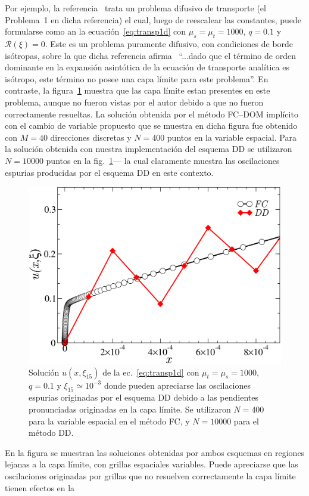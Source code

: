 Por ejemplo, la referencia~\cite{Larsen1987} trata un problema 
difusivo de transporte (el Problema~1 en dicha referencia) 
el cual, luego de reescalear las constantes, puede formularse 
como an la ecuación~\eqref{eq:transp1d} con $\mu_s=\mu_t=1000$,
 $q=0.1$ y $\mathcal{R}(\xi)=0$. Este es un problema 
 puramente difusivo, con condiciones de borde isótropas, 
 sobre la que dicha referencia afirma~\cite[pp. 317]{Larsen1987} 
 ``...dado que el término de orden dominante en la expansión asintótica 
 de la ecuación de transporte analítica es isótropo, 
 este término no posee una capa límite para este problema''. 
 En contraste, la figura~\ref{fig:DDlayer} muestra que 
 las capa límite estan presentes en este problema, aunque 
 no fueron vistas por el autor debido a que no fueron correctamente 
 resueltas. La solución obtenida por el método FC--DOM implícito 
 con el cambio de variable propuesto que se muestra en dicha figura 
 fue obtenido con $M=40$ direcciones discretas y $N=400$ puntos 
 en la variable espacial. Para la solución obtenida con nuestra implementación 
 del esquema DD se utilizaron $N=10000$ puntos en la fig.~\ref{fig:DDlayer}---
 la cual claramente muestra las oscilaciones espurias producidas 
 por el esquema DD en este contexto.
\begin{figure}[h!]
\centering
  \includegraphics[width=0.5\linewidth]{figuras/layerlar.pdf}
  \caption{Solución $u(x,\xi_{15})$ de la ec.~\eqref{eq:transp1d} 
  con $\mu_t=\mu_s=1000$, $q=0.1$ y $\xi_{\text{15}} \simeq 10^{-3}$
  donde pueden apreciarse las oscilaciones espurias originadas 
  por el esquema DD debido a las pendientes pronunciadas originadas 
  en la capa límite. Se utilizaron $N=400$ para la variable espacial 
  en el método FC, y  $N=10000$ para el método DD.}
 \label{fig:DDlayer}
\end{figure}
En la figura se muestran las soluciones obtenidas por ambos esquemas 
en regiones lejanas a la capa límite, con grillas espaciales variables. 
Puede apreciarse que las oscilaciones originadas por grillas que 
no resuelven correctamente la capa límite tienen efectos en la 
